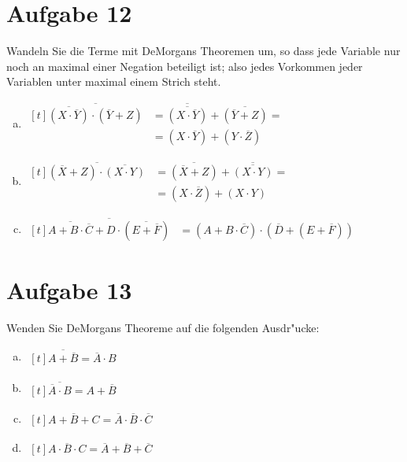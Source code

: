 \documentclass[10pt, oneside]{article}
\begin{document}
\section{Aufgabe 12}

Wandeln Sie die Terme mit DeMorgans Theoremen um, so dass jede Variable nur
noch an maximal einer Negation beteiligt ist; also jedes Vorkommen jeder
Variablen unter maximal einem Strich steht.
\begin{enumerate}[(a)]
    \item $\begin{aligned}[t]
            \overline{\overline{(X \cdot \overline{Y})} \cdot (\overline{Y} + Z)} &= \overline{\overline{(X \cdot \overline{Y})}} + \overline{(\overline{Y} + Z)} = \\
                                                                                  &= (X \cdot \overline{Y}) + (Y \cdot \overline{Z})
        \end{aligned}$
    \item $\begin{aligned}[t]
            \overline{(\overline{X} + Z) \cdot \overline{(X \cdot Y)}} &= \overline{(\overline{X} + Z)} + \overline{\overline{(X \cdot Y)}} = \\
                                                                       &= (X \cdot \overline{Z}) + (X \cdot Y)
        \end{aligned}$
    \item $\begin{aligned}[t]
            \overline{\overline{A + B \cdot \overline{C}} + D \cdot (\overline{E + \overline{F}})} &= (A + B \cdot \overline{C}) \cdot (\overline{D} + (E + \overline{F}))
        \end{aligned}$
\end{enumerate}

\section{Aufgabe 13}

Wenden Sie DeMorgans Theoreme auf die folgenden Ausdr"ucke:
\begin{enumerate}[(a)]
    \item $\begin{aligned}[t]
            \overline{A + \overline{B}} = \overline{A} \cdot B
        \end{aligned}$
    \item $\begin{aligned}[t]
            \overline{\overline{A} \cdot B} = A + \overline{B}
        \end{aligned}$
    \item $\begin{aligned}[t]
            \overline{A + B + C} = \overline{A} \cdot \overline{B} \cdot \overline{C}
        \end{aligned}$
    \item $\begin{aligned}[t]
            \overline{A \cdot B \cdot C} = \overline{A} + \overline{B} + \overline{C}
        \end{aligned}$
\end{enumerate}
\end{document}
